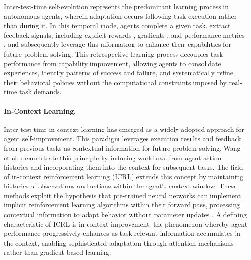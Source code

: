 \documentclass[10pt]{article} %
\begin{document}
Inter-test-time self-evolution represents the predominant learning process in autonomous agents, wherein adaptation occurs following task execution rather than during it. In this temporal mode, agents complete a given task, extract feedback signals, including explicit rewards \citep{gao2024designing}, gradients \citep{amari1993backpropagation, bottou2010large}, and performance metrics \citep{ge2023openagi}, and subsequently leverage this information to enhance their capabilities for future problem-solving. This retrospective learning process decouples task performance from capability improvement, allowing agents to consolidate experiences, identify patterns of success and failure, and systematically refine their behavioral policies without the computational constraints imposed by real-time task demands.

\paragraph{In-Context Learning.} Inter-test-time in-context learning has emerged as a widely adopted approach for agent self-improvement. This paradigm leverages execution results and feedback from previous tasks as contextual information for future problem-solving. Wang et al. \citep{wang2024agent} demonstrate this principle by inducing workflows from agent action histories and incorporating them into the context for subsequent tasks. The field of in-context reinforcement learning (ICRL) \citep{moeini2025survey, laskin2022context, lee2023supervised} extends this concept by maintaining histories of observations and actions within the agent's context window. These methods exploit the hypothesis that pre-trained neural networks can implement implicit reinforcement learning algorithms within their forward pass, processing contextual information to adapt behavior without parameter updates \citep{kirsch2023towards}. A defining characteristic of ICRL is in-context improvement: the phenomenon whereby agent performance progressively enhances as task-relevant information accumulates in the context, enabling sophisticated adaptation through attention mechanisms rather than gradient-based learning.
\end{document}
